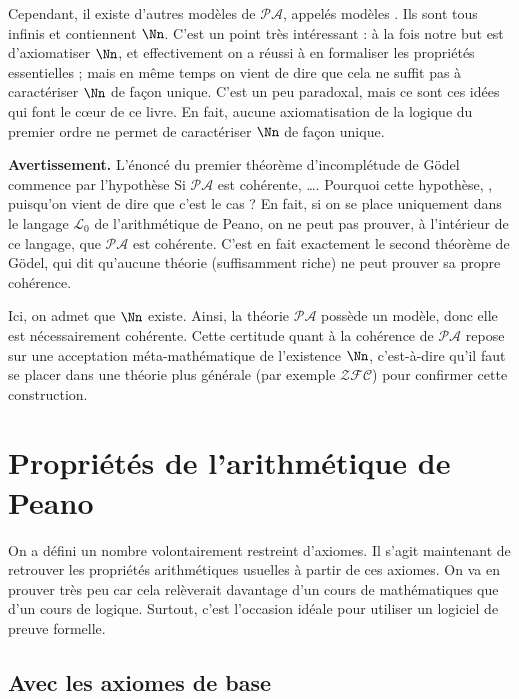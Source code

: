 \documentclass[11pt,class=report,crop=false]{standalone}
\begin{document}
\medskip

Cependant, il existe d'autres modèles de $\mathcal{PA}$, appelés modèles . Ils sont tous infinis et contiennent $\Nn$. C'est un point très intéressant : à la fois notre but est d'axiomatiser $\Nn$, et effectivement on a réussi à en formaliser les propriétés essentielles ; mais en même temps on vient de dire que cela ne suffit pas à caractériser $\Nn$ de façon unique. C'est un peu paradoxal, mais ce sont ces idées qui font le c\oe ur de ce livre. En fait, aucune axiomatisation de la logique du premier ordre ne permet de caractériser $\Nn$ de façon unique.

\bigskip

\textbf{Avertissement.} L'énoncé du premier théorème d'incomplétude de Gödel commence par l'hypothèse \og{}Si $\mathcal{PA}$ est cohérente, \ldots\fg{}. Pourquoi cette hypothèse, , puisqu'on vient de dire que c'est le cas ? En fait, si on se place uniquement dans le langage $\mathcal{L}_0$ de l'arithmétique de Peano, on ne peut pas prouver, à l'intérieur de ce langage, que $\mathcal{PA}$ est cohérente. C'est en fait exactement le second théorème de Gödel, qui dit qu'aucune théorie (suffisamment riche) ne peut prouver sa propre cohérence. 

Ici, on admet que $\Nn$ existe. Ainsi, la théorie $\mathcal{PA}$ possède un modèle, donc elle est nécessairement cohérente. Cette certitude quant à la cohérence de $\mathcal{PA}$ repose sur une acceptation méta-mathématique de l'existence $\Nn$, c'est-à-dire qu'il faut se placer dans une théorie plus générale (par exemple $\mathcal{ZFC}$) pour confirmer cette construction.




\section{Propriétés de l'arithmétique de Peano}

On a défini un nombre volontairement restreint d'axiomes. Il s'agit maintenant de retrouver les propriétés arithmétiques usuelles à partir de ces axiomes. On va en prouver très peu car cela relèverait davantage d'un cours de mathématiques que d'un cours de logique. Surtout, c'est l'occasion idéale pour utiliser un logiciel de preuve formelle.

\subsection{Avec les axiomes de base}
\end{document}
